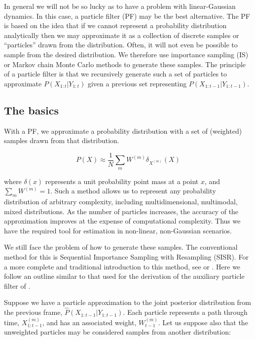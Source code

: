 In general we will not be so lucky as to have a problem with linear-Gaussian dynamics. In this case, a particle filter (PF) may be the best alternative. The PF is based on the idea that if we cannot represent a probability distribution analytically then we may approximate it as a collection of discrete samples or ``particles'' drawn from the distribution. Often, it will not even be possible to sample from the desired distribution. We therefore use importance sampling (IS) or Markov chain Monte Carlo methods to generate these samples. The principle of a particle filter is that we recursively generate such a set of particles to approximate $P(X_{1:t}|Y_{1:t})$ given a previous set representing $P(X_{1:t-1}|Y_{1:t-1})$.

\subsection{The basics}

With a PF, we approximate a probability distribution with a set of (weighted) samples drawn from that distribution.

\begin{equation}
P(X) \approx \frac{1}{N} \sum_m{W^{(m)} \delta_{X^{(m)}} (X)}
\label{eq:ParticleApprox}
\end{equation}

where $\delta (x)$ represents a unit probability point mass at a point $x$, and $\sum_m{W^{(m)}}=1$. Such a method allows us to represent any probability distribution of arbitrary complexity, including multidimensional, multimodal, mixed distributions. As the number of particles increases, the accuracy of the approximation improves at the expense of computational complexity. Thus we have the required tool for estimation in non-linear, non-Gaussian scenarios.

We still face the problem of how to generate these samples. The conventional method for this is Sequential Importance Sampling with Resampling (SISR). For a more complete and traditional introduction to this method, see \cite{Cappe2007} or \cite{Doucet2009}. Here we follow an outline similar to that used for the derivation of the auxiliary particle filter of \cite{Pitt1999}.

Suppose we have a particle approximation to the joint posterior distribution from the previous frame, $\hat{P}(X_{1:t-1}|Y_{1:t-1})$. Each particle represents a path through time, $X_{1:t-1}^{(m)}$, and has an associated weight, $W_{t-1}^{(m)}$. Let us suppose also that the unweighted particles may be considered samples from another distribution:

